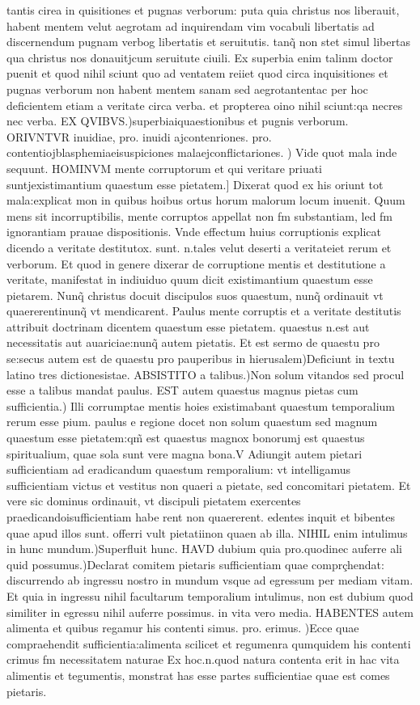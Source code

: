 \documentclass{article}
\begin{document}
\begin{pages}
\pstart tantis cirea in quisitiones et pugnas verborum: puta quia christus nos liberauit, habent mentem velut aegrotam ad inquirendam vim vocabuli libertatis ad discernendum pugnam verbog libertatis et seruitutis. tanq̃ non stet simul libertas qua christus nos donauitjcum seruitute ciuili. Ex superbia enim talinm doctor puenit et quod nihil sciunt quo ad ventatem reiiet quod circa inquisitiones et pugnas verborum non habent mentem sanam sed aegrotantentac per hoc deficientem etiam a veritate circa verba. et propterea oino nihil sciunt:qa necres nec verba. EX QVIBVS.)superbiaiquaestionibus et pugnis verborum. ORIVNTVR inuidiae, pro. inuidi ajcontenriones. pro. contentiojblasphemiaeisuspiciones malaejconflictariones. ) Vide quot mala inde sequunt. HOMINVM mente corruptorum et qui veritare priuati suntjexistimantium quaestum esse pietatem.] Dixerat quod ex his oriunt tot mala:explicat mon in quibus hoibus ortus horum malorum locum inuenit. Quum mens sit incorruptibilis, mente corruptos appellat non fm substantiam, led fm ignorantiam prauae dispositionis. Vnde effectum huius corruptionis explicat dicendo a veritate destitutox. sunt. n.tales velut deserti a veritateiet rerum et verborum. Et quod in genere dixerar de corruptione mentis et destitutione a veritate, manifestat in indiuiduo quum dicit existimantium quaestum esse pietarem. Nunq̃ christus docuit discipulos suos quaestum, nunq̃ ordinauit vt quaererentinunq̃ vt mendicarent. Paulus mente corruptis et a veritate destitutis attribuit doctrinam dicentem quaestum esse pietatem. quaestus n.est aut necessitatis aut auariciae:nunq̃ autem pietatis. Et est sermo de quaestu pro se:secus autem est de quaestu pro pauperibus in hierusalem)Deficiunt in textu latino tres dictionesistae. ABSISTITO a talibus.)Non solum vitandos sed procul esse a talibus mandat paulus. EST autem quaestus magnus pietas cum sufficientia.) Illi corrumptae mentis hoies existimabant quaestum temporalium rerum esse pium. paulus e regione docet non solum quaestum sed magnum quaestum esse pietatem:qm̃ est quaestus magnox bonorumj est quaestus spiritualium, quae sola sunt vere magna bona.V Adiungit autem pietari sufficientiam ad eradicandum quaestum remporalium: vt intelligamus sufficientiam victus et vestitus non quaeri a pietate, sed concomitari pietatem. Et vere sic dominus ordinauit, vt discipuli pietatem exercentes praedicandoisufficientiam habe rent non quaererent. edentes inquit et bibentes quae apud illos sunt. offerri vult pietatiinon quaen ab illa. NIHIL enim intulimus in hunc mundum.)Superfluit hunc. HAVD dubium quia pro.quodinec auferre ali quid possumus.)Declarat comitem pietaris sufficientiam quae comprçhendat: discurrendo ab ingressu nostro in mundum vsque ad egressum per mediam vitam. Et quia in ingressu nihil facultarum temporalium intulimus, non est dubium quod similiter in egressu nihil auferre possimus. in vita vero media. HABENTES autem alimenta et quibus regamur his contenti simus. pro. erimus. )Ecce quae compraehendit sufficientia:alimenta scilicet et regumenra qumquidem his contenti crimus fm necessitatem naturae Ex hoc.n.quod natura contenta erit in hac vita alimentis et tegumentis, monstrat has esse partes sufficientiae quae est comes pietaris.  \pend

\end{pages}
\end{document}
